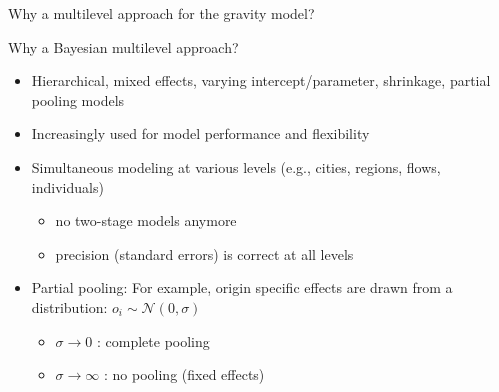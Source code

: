 \documentclass{beamer}
\begin{document}
\begin{frame}[fragile]{Why a \alert{multilevel} approach for the gravity model?}
\begin{description}
\begin{figure}
	\end{figure}
\end{description}
\end{frame}

\begin{frame}{Why a \alert{Bayesian} multilevel approach?}
\begin{itemize}
	\item Hierarchical, mixed effects, varying intercept/parameter, shrinkage, partial pooling models\pause
	\item Increasingly used for model \alert{performance} and \alert{flexibility} \pause
    \item \alert{Simultaneous} modeling at various levels (e.g., cities, regions, flows, individuals) 
    \begin{itemize}
    	\item no two-stage models anymore 
    	\item precision (standard errors) is correct \alert{at all levels}\pause
    \end{itemize}
	\item \alert{Partial pooling}: For example, origin specific effects are drawn from a distribution: $o_{i} \sim  \mathcal{N}(0, \sigma)$
	\begin{itemize}
		\item $\sigma \longrightarrow 0$ : complete pooling
		\item $\sigma \longrightarrow \infty$ : no pooling (fixed effects)
	\end{itemize}
\end{itemize}
\end{frame}
\end{document}
